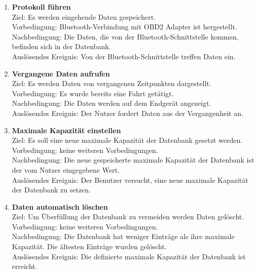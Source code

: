 \documentclass[pflichtenheft.tex]{subfiles}
\begin{document}
	\begin{enumerate}
		\setcounter{enumi}{\value{enumTemp}}
		\item{\textbf{Protokoll führen}} \\ Ziel: Es werden eingehende Daten gespeichert.\\
		Vorbedingung: Bluetooth-Verbindung mit OBD2 Adapter ist hergestellt. 
		Nachbedingung: Die Daten, die von der Bluetooth-Schnittstelle kommen, befinden sich in der Datenbank. \\ 
		Auslösendes Ereignis: Von der Bluetooth-Schnittstelle treffen Daten ein.\\%
		
		\item{\textbf{Vergangene Daten aufrufen}} \label{pastData} \\ Ziel: Es werden Daten von vergangenen Zeitpunkten dargestellt. \\ Vorbedingung: Es wurde bereits eine Fahrt getätigt.\\
		Nachbedingung: Die Daten werden auf dem Endgerät angezeigt. \\
		Auslösendes Ereignis: Der Nutzer fordert Daten aus der Vergangenheit an.\\
		\item{\textbf{Maximale Kapazität einstellen}}\\
		Ziel: Es soll eine neue maximale Kapazität der Datenbank gesetzt werden. \\ Vorbedingung: keine weiteren Vorbedingungen.\\
		Nachbedingung: Die neue gespeicherte maximale Kapazität der Datenbank ist der vom Nutzer eingegebene Wert.\\
		Auslösendes Ereignis: Der Benutzer versucht, eine neue maximale Kapazität der Datenbank zu setzen. 
		
		\item{\textbf{Daten automatisch löschen}} \label{deleteData} \\ Ziel: Um Überfüllung der Datenbank zu vermeiden werden Daten gelöscht. \\ Vorbedingung: keine weiteren Vorbedingungen.\\ Nachbedingung: Die Datenbank hat weniger Einträge als ihre maximale Kapazität. Die ältesten Einträge wurden gelöscht.\\
		Auslösendes Ereignis: Die definierte maximale Kapazität der Datenbank ist erreicht. 

		\renewcommand{\theenumi}{/FA\ifnum \value{enumi}<10 0\fi\arabic{enumi}0W/}
		\renewcommand{\labelenumi}{\theenumi}
		\renewcommand{\theenumii}{\arabic{enumii}}
		\renewcommand{\labelenumii}{/FA\ifnum \value{enumi}<10 0\fi\arabic{enumi}\arabic{enumii}W/}


\end{enumerate}
\end{document}

